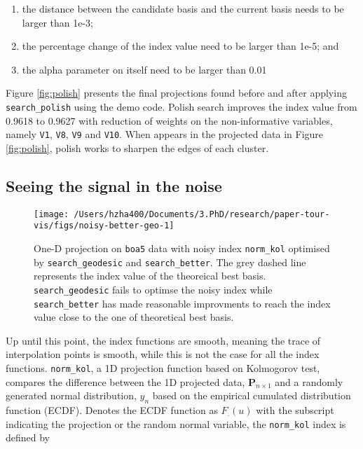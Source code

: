 \documentclass[12pt]{article}
\providecommand{\tightlist}{%
  \setlength{\itemsep}{0pt}\setlength{\parskip}{0pt}}
\begin{document}
\begin{enumerate}
\def\labelenumi{\arabic{enumi})}
\tightlist
\item
  the distance between the candidate basis and the current basis needs to be larger than 1e-3;
\item
  the percentage change of the index value need to be larger than 1e-5; and
\item
  the alpha parameter on itself need to be larger than 0.01
\end{enumerate}

Figure \ref{fig:polish} presents the final projections found before and after applying \texttt{search\_polish} using the demo code. Polish search improves the index value from 0.9618 to 0.9627 with reduction of weights on the non-informative variables, namely \texttt{V1}, \texttt{V8}, \texttt{V9} and \texttt{V10}. When appears in the projected data in Figure \ref{fig:polish}, polish works to sharpen the edges of each cluster.

\hypertarget{seeing-the-signal-in-the-noise}{%
\subsection{Seeing the signal in the noise}\label{seeing-the-signal-in-the-noise}}

\begin{figure}

{\centering \texttt{[image: /Users/hzha400/Documents/3.PhD/research/paper-tour-vis/figs/noisy-better-geo-1]} 

}

\caption{One-D projection on \texttt{boa5} data with noisy index \texttt{norm\_kol} optimised by \texttt{search\_geodesic} and \texttt{search\_better}. The grey dashed line represents the index value of the theoreical best basis. \texttt{search\_geodesic} fails to optimse the noisy index while \texttt{search\_better} has made reasonable improvments to reach the index value close to the one of theoretical best basis.}\label{fig:noisy-better-geo}
\end{figure}



Up until this point, the index functions are smooth, meaning the trace of interpolation points is smooth, while this is not the case for all the index functions. \texttt{norm\_kol}, a 1D projection function based on Kolmogorov test, compares the difference between the 1D projected data, \(\mathbf{P}_{n \times 1}\) and a randomly generated normal distribution, \(y_n\) based on the empirical cumulated distribution function (ECDF). Denotes the ECDF function as \(F_{.}(u)\) with the subscript indicating the projection or the random normal variable, the \texttt{norm\_kol} index is defined by
\end{document}
